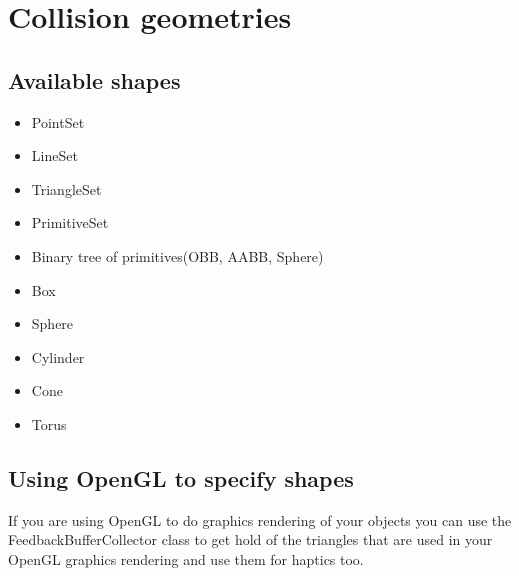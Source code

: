 \chapter{Collision geometries}

\section{Available shapes}

\begin{itemize}
\item PointSet
\item LineSet
\item TriangleSet
\item PrimitiveSet
\item Binary tree of primitives(OBB, AABB, Sphere)
\item Box
\item Sphere
\item Cylinder
\item Cone
\item Torus
\end{itemize}


\section{Using OpenGL to specify shapes}
If you are using OpenGL to do graphics rendering of your objects you
can use the FeedbackBufferCollector class to get hold of the triangles
that are used in your OpenGL graphics rendering and use them for
haptics too. 


